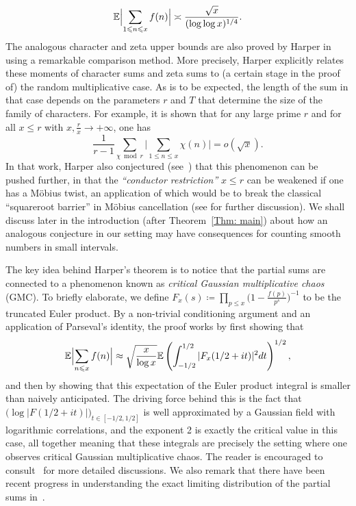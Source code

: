 \documentclass[12pt,a4paper,reqno]{amsart}
\numberwithin{equation}{section}
\def\E{\mathbb E}
\def\leq {\leqslant}
\theoremstyle{remark}
\theoremstyle{definition}
\numberwithin{equation}{section}
\theoremstyle{remark}
\def\E{\mathbb E}
\begin{document}
\[
\E \Bigl|\sum_{1\leq n \leq x} f(n) \Bigr| \asymp \frac{\sqrt{x}}{(\log \log x)^{1/4}} .  
\]
The analogous character and zeta upper bounds are also proved by Harper in \cite{harpertypical} using a remarkable comparison method. More precisely, Harper explicitly relates these moments of character sums and zeta sums to (a certain stage in the proof of) the random multiplicative case. As is to be expected, the length of the sum in that case depends on the parameters $r$ and $T$ that determine the size of the family of characters. For example, it is shown that for any large prime $r$ and for all $x\leq r$ with $x, \frac{r}{x} \to +\infty$, one has
\[
\frac{1}{r-1} \sum_{\chi \bmod r} \Big|\sum_{1\leq n \leq x}\chi(n) \Big| = o(\sqrt{x}). 
\]
In that work, Harper also conjectured (see~\cite[Equation~(1.2)]{harpertypical}) that this phenomenon can be pushed further, in that the \textit{``conductor restriction''} $x\leq r$ can be weakened if one has a M\"obius twist, an application of which would be to break the classical ``squareroot barrier'' in M\"obius cancellation (see \cite{WXRatios} for further discussion). We shall discuss later in the introduction (after Theorem~\ref{Thm: main}) about how an analogous conjecture in our setting may have consequences for counting smooth numbers in small intervals.

The key idea behind Harper's theorem is to notice that the partial sums are connected to a phenomenon known as \textit{critical Gaussian multiplicative chaos} (GMC). To briefly elaborate, we define $F_x (s) \coloneqq \prod_{p\leq x} \bigl( 1 - \frac{f(p)}{p^{s}} \bigr)^{-1}$ to be the truncated Euler product. By a non-trivial conditioning argument and an application of Parseval's identity, the proof works by first showing that
\begin{equation}\label{equ:full sum relation to EP}
\E \Bigl| \sum_{n \leq x} f(n) \Bigr| \approx \sqrt{\frac{x}{\log x}} \E \left( \int_{-1/2}^{1/2} |F_x (1/2 + it)|^{2} dt\right)^{1/2} ,
\end{equation}
and then by showing that this expectation of the Euler product integral is smaller than naively anticipated. The driving force behind this is the fact that $\bigl( \log|F(1/2 + it)| \bigr)_{t \in [-1/2,1/2]}$ is well approximated by a Gaussian field with logarithmic correlations, and the exponent 2 is exactly the critical value in this case, all together meaning that these integrals are precisely the setting where one observes critical Gaussian multiplicative chaos. The reader is encouraged to consult~\cite{Harperhigh, HarperIII} for more detailed discussions. We also remark that there have been recent progress in understanding the exact limiting distribution of the partial sums in~\cite{GW-Final, Hardy2025}.
\end{document}

